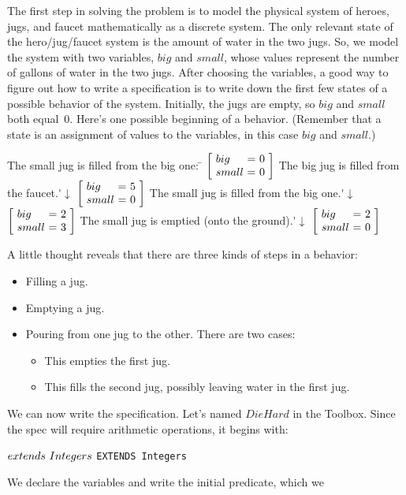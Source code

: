 The first step in solving the problem is to model the physical system
of heroes, jugs, and faucet mathematically as a discrete system.
%
The only relevant state of the hero/jug/faucet system is the amount of
water in the two jugs.  So, we model the system with two variables,
$big$ and $small$, whose values represent the number of gallons of
water in the two jugs.  After choosing the variables, a good way to
figure out how to write a specification is to write down the first few
states of a possible behavior of the system.  Initially, the jugs are
empty, so $big$ and $small$ both equal~0.  Here's one possible
beginning of a behavior.  (Remember that a state is an assignment of
values to the variables, in this case $big$ and $small$.)
\begin{display}
\begin{tabbing}
The small jug is filled from the big one: \= \kill
%
\>
$\dhstate{0}{0}$
%
\>The big jug is filled from the faucet.\'$\downarrow$
%
\>
$\dhstate{5}{0}$ 
%
%
\>The small jug is filled from the big one.\'$\downarrow$
%
\>
$\dhstate{2}{3}$
%
\>The small jug is emptied (onto the ground).\'$\downarrow$
%
\> $\dhstate{2}{0}$
\end{tabbing}
\end{display}
A little thought reveals that there are three kinds of steps in a
behavior:
\begin{itemize}
\item Filling a jug.
\item Emptying a jug.
\item Pouring from one jug to the other.  There are two cases:
\begin{itemize}
\item This empties the first jug.
\item This fills the second jug, possibly leaving water
      in the first jug.
\end{itemize}
\end{itemize}
We can now write the specification.  Let's  named $DieHard$ in the Toolbox.  Since the spec
will require arithmetic operations, it begins with:
\begin{display}
\begin{twocols}%
$\EXTENDS\ Integers$
\midcol
\verb|EXTENDS Integers|
\end{twocols}
\end{display}
We declare the variables and write the initial predicate, which we
